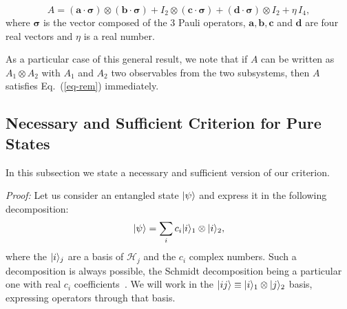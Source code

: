 \[ A = (\mathbf{a}\cdot\boldsymbol{\sigma})  \otimes  (\mathbf{b}\cdot\boldsymbol{\sigma})  + I_2 \otimes (\mathbf{c}\cdot\boldsymbol{\sigma}) + (\mathbf{d}\cdot\boldsymbol{\sigma} ) \otimes I_2 +\eta \, I_4 ,\]
where $\boldsymbol{\sigma}$ is the vector composed of the 3 Pauli operators,  $\mathbf{a}, \mathbf{b}, \mathbf{c}$ and $\mathbf{d}$ are
four real vectors and $\eta$ is a real number.

As a particular case of this general result, we note that if $A$ can be written as $A_1 \otimes A_2$ with $A_1$ and $A_2$ two observables from the two subsystems, then $A$ satisfies Eq.~(\ref{eq-rem}) immediately.

\subsection{Necessary and Sufficient Criterion for Pure States}

In this subsection we state a necessary and sufficient version of our criterion.


\emph{Proof:} Let us consider an entangled state $| \psi \rangle$ and express it in the following decomposition:
\[ | \psi \rangle=\sum_i c_i | i \rangle_1\otimes | i \rangle_2,\]
where the $| i \rangle_j$ are a basis of $\mathcal{H}_j$ and the $c_i$ complex numbers. Such a decomposition is always possible, the Schmidt decomposition being a particular one with real $c_i$ coefficients~\cite{Min05}.
We will work in the $| ij \rangle \equiv | i \rangle_1\otimes | j \rangle_2$ basis, expressing operators through that basis.

